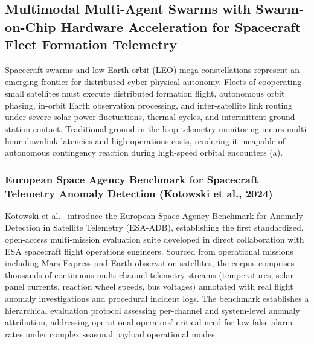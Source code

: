 \subsection{Multimodal Multi-Agent Swarms with Swarm-on-Chip Hardware Acceleration for Spacecraft Fleet Formation Telemetry}
\label{sec:spacecraft_swarm_telemetry}

Spacecraft swarms and low-Earth orbit (LEO) mega-constellations represent an emerging frontier for distributed cyber-physical autonomy. Fleets of cooperating small satellites must execute distributed formation flight, autonomous orbit phasing, in-orbit Earth observation processing, and inter-satellite link routing under severe solar power fluctuations, thermal cycles, and intermittent ground station contact. Traditional ground-in-the-loop telemetry monitoring incurs multi-hour downlink latencies and high operations costs, rendering it incapable of autonomous contingency reaction during high-speed orbital encounters (a).

\subsubsection{European Space Agency Benchmark for Spacecraft Telemetry Anomaly Detection (Kotowski et al., 2024)}
Kotowski et al.~\cite{Kotowski2024ESABenchmark} introduce the European Space Agency Benchmark for Anomaly Detection in Satellite Telemetry (ESA-ADB), establishing the first standardized, open-access multi-mission evaluation suite developed in direct collaboration with ESA spacecraft flight operations engineers. Sourced from operational missions including Mars Express and Earth observation satellites, the corpus comprises thousands of continuous multi-channel telemetry streams (temperatures, solar panel currents, reaction wheel speeds, bus voltages) annotated with real flight anomaly investigations and procedural incident logs. The benchmark establishes a hierarchical evaluation protocol assessing per-channel and system-level anomaly attribution, addressing operational operators' critical need for low false-alarm rates under complex seasonal payload operational modes.

